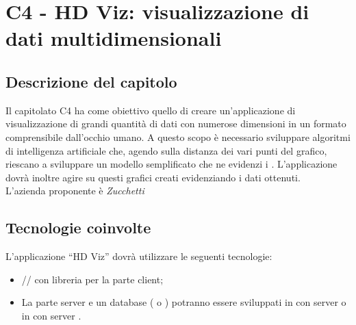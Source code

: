 \section{C4 - HD Viz: visualizzazione di dati multidimensionali}

\subsection{Descrizione del capitolo}
Il capitolato C4 ha come obiettivo quello di creare un'applicazione di visualizzazione di grandi quantità di dati con numerose dimensioni in un formato comprensibile dall'occhio umano. A questo scopo è necessario sviluppare algoritmi di intelligenza artificiale che, agendo sulla distanza dei vari punti del grafico, riescano a sviluppare un modello semplificato che ne evidenzi i . 
L'applicazione dovrà inoltre agire su questi grafici creati evidenziando i dati ottenuti.\\
L'azienda proponente è \textit{Zucchetti}

\subsection{Tecnologie coinvolte}
L'applicazione “HD Viz” dovrà utilizzare le seguenti tecnologie:
\begin{itemize}
\item {}// con libreria  per la parte client;
\item La parte server e un database ( o ) potranno essere sviluppati in  con server  o in  con server .
\end{itemize}

